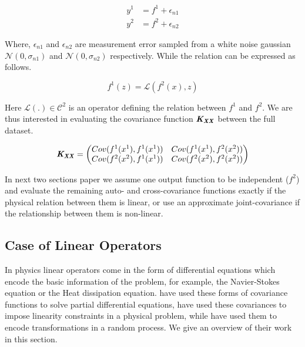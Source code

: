 \begin{align} \label{eq:relationOutputLatent}
y^{1} & = f^{1} + \epsilon_{n1} \\
y^{2} & = f^{2} + \epsilon_{n2}
\end{align} 

Where, \(\epsilon_{n1}\) and \(\epsilon_{n2}\) are measurement error sampled from a white noise gaussian \(\mathcal{N}(0, \sigma_{n1})\) and \(\mathcal{N}(0, \sigma_{n2})\) respectively. While the relation can be expressed as follows.

\begin{equation}\label{eq:physicalRelation}
    f^{1}(z) = \mathcal{L}\left ( f^{2}(x), z \right )
\end{equation}

Here \(\mathcal{L} \left ( . \right ) \in \mathcal{C}^{2}\) is an operator defining the relation between \(f^{1}\) and \(f^{2}\). We are thus interested in evaluating the covariance function $\bm{\mathit{K_{XX}}}$ between the full dataset. 

\begin{equation}\label{eq:exactJointCovariance}
      \bm{\mathit{K_{XX}}} =  \begin{pmatrix}
    Cov(f^1(x^{1}), f^1(x^{1}))  & Cov(f^1(x^{1}), f^2(x^{2}))\\ 
    Cov(f^2(x^{2}), f^1(x^{1}))     & Cov(f^2(x^{2}), f^2(x^{2}))
   \end{pmatrix}
\end{equation}

In next two sections paper we assume one output function to be independent ($f^2$) and evaluate the remaining auto- and cross-covariance functions exactly if the physical relation between them is linear, or use an approximate joint-covariance if the relationship between them is non-linear\cite{Constantinescu2013}.

\subsection{Case of Linear Operators}\label{subsecLinearOperators}
In physics linear operators come in the form of differential equations which encode the basic information of the problem, for example, the Navier-Stokes equation or the Heat dissipation equation. \cite{journals/jmlr/AlvarezLL09, sarkka2011linear} have used these forms of covariance functions to solve partial differential equations, \cite{jidling2017linearly} have used these covariances to impose linearity constraints in a physical problem, while \cite{ginsbourger2013invariances} have used them to encode transformations in a random process. We give an overview of their work in this section. 

